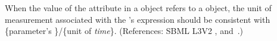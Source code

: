When the value of the attribute  in a \RateRule object
refers to a \Parameter object, the unit of measurement associated with
the \RateRule's  expression should be consistent with
\{parameter's \}/\{unit of \emph{time}\}. (References: SBML
L3V2 , 
and~.)
